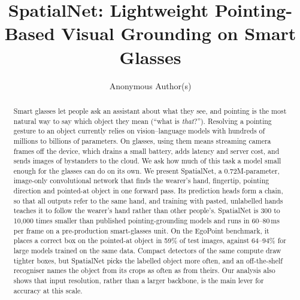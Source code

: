 \documentclass[acmsmall,screen,review,anonymous]{acmart}
\begin{document}
\title[SpatialNet]{SpatialNet: Lightweight Pointing-Based Visual Grounding on Smart Glasses}

\author{Anonymous Author(s)}

\begin{abstract}
Smart glasses let people ask an assistant about what they see, and pointing is the most natural way to say which object they mean (``what is \emph{that}?''). Resolving a pointing gesture to an object currently relies on vision--language models with hundreds of millions to billions of parameters. On glasses, using them means streaming camera frames off the device, which drains a small battery, adds latency and server cost, and sends images of bystanders to the cloud. We ask how much of this task a model small enough for the glasses can do on its own. We present SpatialNet, a 0.72M-parameter, image-only convolutional network that finds the wearer's hand, fingertip, pointing direction and pointed-at object in one forward pass. Its prediction heads form a chain, so that all outputs refer to the same hand, and training with pasted, unlabelled hands teaches it to follow the wearer's hand rather than other people's. SpatialNet is 300 to 10,000 times smaller than published pointing-grounding models and runs in 60--80\,ms per frame on a pre-production smart-glasses unit. On the EgoPoint benchmark, it places a correct box on the pointed-at object in 59\% of test images, against 64--94\% for large models trained on the same data. Compact detectors of the same compute draw tighter boxes, but SpatialNet picks the labelled object more often, and an off-the-shelf recogniser names the object from its crops as often as from theirs. Our analysis also shows that input resolution, rather than a larger backbone, is the main lever for accuracy at this scale.
\end{abstract}


\end{document}
